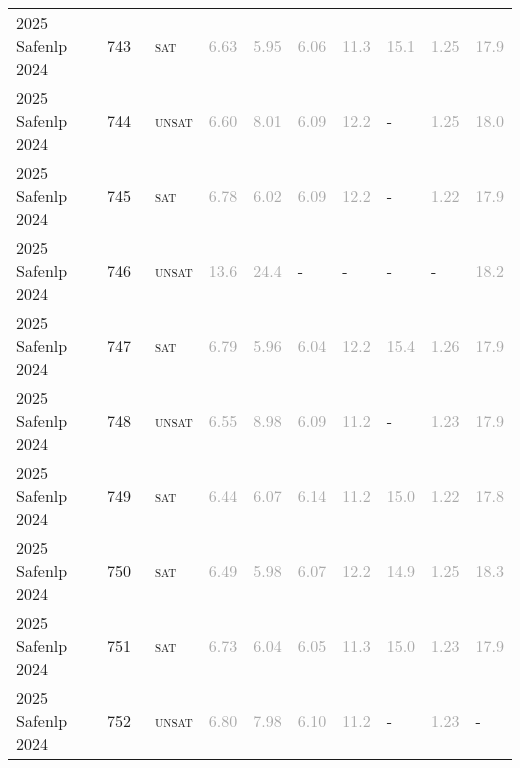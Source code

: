 \begin{center}
{\begin{longtable}{@{}llllllllll@{}}
2025 Safenlp 2024 & 743 & ~\textsc{sat} & \textcolor{darkgray}{6.63} & \textcolor{darkgray}{5.95} & \textcolor{darkgray}{6.06} & \textcolor{darkgray}{11.3} & \textcolor{darkgray}{15.1} & \textcolor{darkgray}{1.25} & \textcolor{darkgray}{17.9} \\
2025 Safenlp 2024 & 744 & ~\textsc{unsat} & \textcolor{darkgray}{6.60} & \textcolor{darkgray}{8.01} & \textcolor{darkgray}{6.09} & \textcolor{darkgray}{12.2} & - & \textcolor{darkgray}{1.25} & \textcolor{darkgray}{18.0} \\
2025 Safenlp 2024 & 745 & ~\textsc{sat} & \textcolor{darkgray}{6.78} & \textcolor{darkgray}{6.02} & \textcolor{darkgray}{6.09} & \textcolor{darkgray}{12.2} & - & \textcolor{darkgray}{1.22} & \textcolor{darkgray}{17.9} \\
2025 Safenlp 2024 & 746 & ~\textsc{unsat} & \textcolor{darkgray}{13.6} & \textcolor{darkgray}{24.4} & - & - & - & - & \textcolor{darkgray}{18.2} \\
2025 Safenlp 2024 & 747 & ~\textsc{sat} & \textcolor{darkgray}{6.79} & \textcolor{darkgray}{5.96} & \textcolor{darkgray}{6.04} & \textcolor{darkgray}{12.2} & \textcolor{darkgray}{15.4} & \textcolor{darkgray}{1.26} & \textcolor{darkgray}{17.9} \\
2025 Safenlp 2024 & 748 & ~\textsc{unsat} & \textcolor{darkgray}{6.55} & \textcolor{darkgray}{8.98} & \textcolor{darkgray}{6.09} & \textcolor{darkgray}{11.2} & - & \textcolor{darkgray}{1.23} & \textcolor{darkgray}{17.9} \\
2025 Safenlp 2024 & 749 & ~\textsc{sat} & \textcolor{darkgray}{6.44} & \textcolor{darkgray}{6.07} & \textcolor{darkgray}{6.14} & \textcolor{darkgray}{11.2} & \textcolor{darkgray}{15.0} & \textcolor{darkgray}{1.22} & \textcolor{darkgray}{17.8} \\
2025 Safenlp 2024 & 750 & ~\textsc{sat} & \textcolor{darkgray}{6.49} & \textcolor{darkgray}{5.98} & \textcolor{darkgray}{6.07} & \textcolor{darkgray}{12.2} & \textcolor{darkgray}{14.9} & \textcolor{darkgray}{1.25} & \textcolor{darkgray}{18.3} \\
2025 Safenlp 2024 & 751 & ~\textsc{sat} & \textcolor{darkgray}{6.73} & \textcolor{darkgray}{6.04} & \textcolor{darkgray}{6.05} & \textcolor{darkgray}{11.3} & \textcolor{darkgray}{15.0} & \textcolor{darkgray}{1.23} & \textcolor{darkgray}{17.9} \\
2025 Safenlp 2024 & 752 & ~\textsc{unsat} & \textcolor{darkgray}{6.80} & \textcolor{darkgray}{7.98} & \textcolor{darkgray}{6.10} & \textcolor{darkgray}{11.2} & - & \textcolor{darkgray}{1.23} & - \\

\end{longtable}}
\end{center}
